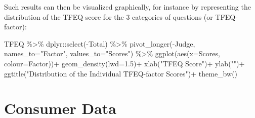 \documentclass[
]{book}
\newenvironment{Shaded}{\begin{snugshade}}{\end{snugshade}}
\newcommand{\AttributeTok}[1]{\textcolor[rgb]{0.77,0.63,0.00}{#1}}
\newcommand{\ConstantTok}[1]{\textcolor[rgb]{0.00,0.00,0.00}{#1}}
\newcommand{\FloatTok}[1]{\textcolor[rgb]{0.00,0.00,0.81}{#1}}
\newcommand{\FunctionTok}[1]{\textcolor[rgb]{0.00,0.00,0.00}{#1}}
\newcommand{\NormalTok}[1]{#1}
\newcommand{\SpecialCharTok}[1]{\textcolor[rgb]{0.00,0.00,0.00}{#1}}
\newcommand{\StringTok}[1]{\textcolor[rgb]{0.31,0.60,0.02}{#1}}
\begin{document}
\begin{Shaded}
\end{Shaded}

Such results can then be visualized graphically, for instance by representing the distribution of the TFEQ score for the 3 categories of questions (or TFEQ-factor):

\begin{Shaded}
\begin{Highlighting}[]
\NormalTok{TFEQ }\SpecialCharTok{\%\textgreater{}\%} 
\NormalTok{  dplyr}\SpecialCharTok{::}\FunctionTok{select}\NormalTok{(}\SpecialCharTok{{-}}\NormalTok{Total) }\SpecialCharTok{\%\textgreater{}\%} 
  \FunctionTok{pivot\_longer}\NormalTok{(}\SpecialCharTok{{-}}\NormalTok{Judge, }\AttributeTok{names\_to=}\StringTok{"Factor"}\NormalTok{, }\AttributeTok{values\_to=}\StringTok{"Scores"}\NormalTok{) }\SpecialCharTok{\%\textgreater{}\%} 
  \FunctionTok{ggplot}\NormalTok{(}\FunctionTok{aes}\NormalTok{(}\AttributeTok{x=}\NormalTok{Scores, }\AttributeTok{colour=}\NormalTok{Factor))}\SpecialCharTok{+}
  \FunctionTok{geom\_density}\NormalTok{(}\AttributeTok{lwd=}\FloatTok{1.5}\NormalTok{)}\SpecialCharTok{+}
  \FunctionTok{xlab}\NormalTok{(}\StringTok{"TFEQ Score"}\NormalTok{)}\SpecialCharTok{+}
  \FunctionTok{ylab}\NormalTok{(}\StringTok{""}\NormalTok{)}\SpecialCharTok{+}
  \FunctionTok{ggtitle}\NormalTok{(}\StringTok{"Distribution of the Individual TFEQ{-}factor Scores"}\NormalTok{)}\SpecialCharTok{+}
  \FunctionTok{theme\_bw}\NormalTok{()}
\end{Highlighting}
\end{Shaded}

\hypertarget{consumer-data}{%
\section{Consumer Data}\label{consumer-data}}
\end{document}
